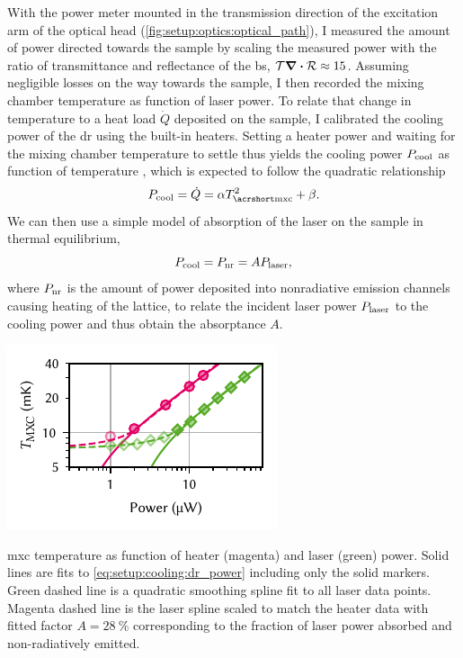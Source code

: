 With the power meter mounted in the transmission direction of the excitation arm of the optical head (\cf \cref{fig:setup:optics:optical_path}), I measured the amount of power directed towards the sample by scaling the measured power with the ratio of transmittance and reflectance of the \gls{bs}, $\mathcal{T}\div\mathcal{R}\approx\num{15}$.
Assuming negligible losses on the way towards the sample, I then recorded the mixing chamber temperature as function of laser power.
To relate that change in temperature to a heat load $\dot{Q}$ deposited on the sample, I calibrated the cooling power of the \gls{dr} using the built-in heaters.
Setting a heater power and waiting for the mixing chamber temperature to settle thus yields the cooling power $P_{\mathrm{cool}}$ as function of temperature \Tmxc, which is expected to follow the quadratic relationship~\cite{DeWaele2011}
\begin{equation}\label{eq:setup:cooling:dr_power}
    P_{\mr{cool}} = \dot{Q} = \alpha \Tmxc^2 + \beta.
\end{equation}
We can then use a simple model of absorption of the laser on the sample in thermal equilibrium,
\begin{equation}\label{eq:setup:cooling:absorptance}
    P_{\mathrm{cool}} = P_{\mathrm{nr}} = A P_{\mathrm{laser}},
\end{equation}
where $P_{\mathrm{nr}}$ is the amount of power deposited into nonradiative emission channels causing heating of the lattice, to relate the incident laser power $P_{\mathrm{laser}}$ to the cooling power and thus obtain the absorptance $A$.

\begin{marginfigure}[*-8]
    \centering
    \includegraphics{img/pdf/setup/laser_heating}
    \caption[]{
        \Acrlong{mxc} temperature as function of heater (magenta) and laser (green) power.
        Solid lines are fits to \cref{eq:setup:cooling:dr_power} including only the solid markers.
        Green dashed line is a quadratic smoothing spline fit to all laser data points.
        Magenta dashed line is the laser spline scaled to match the heater data with fitted factor $A=\qty{28}{\percent}$ corresponding to the fraction of laser power absorbed and non-radiatively emitted.
    }
    \label{fig:setup:cooling:laser}
\end{marginfigure}

